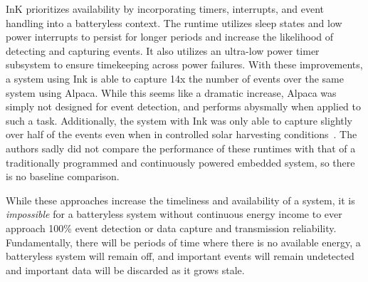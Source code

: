 InK prioritizes availability by incorporating timers, interrupts, and event handling into a batteryless context. 
The runtime utilizes sleep states and low power interrupts to persist for longer periods and increase the likelihood of detecting and capturing events. It also utilizes an ultra-low power timer subsystem to ensure timekeeping across power failures.
With these improvements, a system using Ink is able to capture 14x the number of events over the same system using Alpaca.
While this seems like a dramatic increase, Alpaca was simply not designed for event detection, and performs abysmally when applied to such a task. Additionally, the system with Ink was only able to capture slightly over half of the events even when in controlled solar harvesting conditions~\cite{yildirim2018ink}. The authors sadly did not compare the performance of these runtimes with that of a traditionally programmed and continuously powered embedded system, so there is no baseline comparison.

While these approaches increase the timeliness and availability of a system, 
it is \textit{impossible} for a batteryless system without continuous energy income to ever approach 100\% event detection or data capture and transmission reliability. 
Fundamentally, there will be periods of time where there is no available energy, a batteryless system will remain off, and important events will remain undetected and important data will be discarded as it grows stale.



